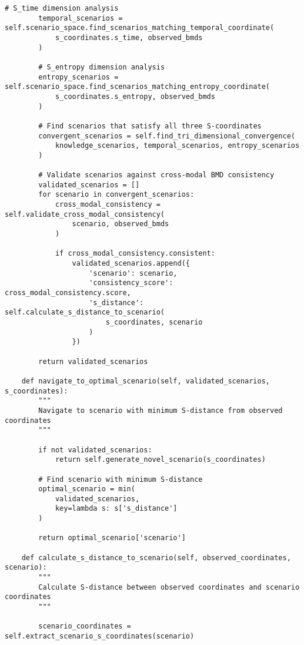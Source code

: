 \documentclass[12pt,a4paper]{article}
\begin{document}
\begin{lstlisting}[style=pythonstyle, caption=S-Entropy Scenario Reconstruction for Meaning Synthesis]
        # S_time dimension analysis  
        temporal_scenarios = self.scenario_space.find_scenarios_matching_temporal_coordinate(
            s_coordinates.s_time, observed_bmds
        )
        
        # S_entropy dimension analysis
        entropy_scenarios = self.scenario_space.find_scenarios_matching_entropy_coordinate(
            s_coordinates.s_entropy, observed_bmds
        )
        
        # Find scenarios that satisfy all three S-coordinates
        convergent_scenarios = self.find_tri_dimensional_convergence(
            knowledge_scenarios, temporal_scenarios, entropy_scenarios
        )
        
        # Validate scenarios against cross-modal BMD consistency
        validated_scenarios = []
        for scenario in convergent_scenarios:
            cross_modal_consistency = self.validate_cross_modal_consistency(
                scenario, observed_bmds
            )
            
            if cross_modal_consistency.consistent:
                validated_scenarios.append({
                    'scenario': scenario,
                    'consistency_score': cross_modal_consistency.score,
                    's_distance': self.calculate_s_distance_to_scenario(
                        s_coordinates, scenario
                    )
                })
        
        return validated_scenarios
    
    def navigate_to_optimal_scenario(self, validated_scenarios, s_coordinates):
        """
        Navigate to scenario with minimum S-distance from observed coordinates
        """
        
        if not validated_scenarios:
            return self.generate_novel_scenario(s_coordinates)
        
        # Find scenario with minimum S-distance
        optimal_scenario = min(
            validated_scenarios,
            key=lambda s: s['s_distance']
        )
        
        return optimal_scenario['scenario']
    
    def calculate_s_distance_to_scenario(self, observed_coordinates, scenario):
        """
        Calculate S-distance between observed coordinates and scenario coordinates
        """
        
        scenario_coordinates = self.extract_scenario_s_coordinates(scenario)
        

\end{lstlisting}
\end{document}
